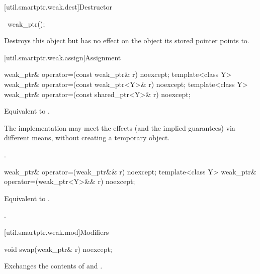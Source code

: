 [util.smartptr.weak.dest]{Destructor}

%
\begin{itemdecl}
~weak_ptr();
\end{itemdecl}

\begin{itemdescr}
\pnum\effects  Destroys this  object but has no
effect on the object its stored pointer points to.
\end{itemdescr}

[util.smartptr.weak.assign]{Assignment}

%
\begin{itemdecl}
weak_ptr& operator=(const weak_ptr& r) noexcept;
template<class Y> weak_ptr& operator=(const weak_ptr<Y>& r) noexcept;
template<class Y> weak_ptr& operator=(const shared_ptr<Y>& r) noexcept;
\end{itemdecl}

\begin{itemdescr}
\pnum\effects  Equivalent to .

\pnum\remarks  The implementation may meet the effects (and the
implied guarantees) via different means, without creating a temporary object.

\pnum\returns  {}.
\end{itemdescr}

%
\begin{itemdecl}
weak_ptr& operator=(weak_ptr&& r) noexcept;
template<class Y> weak_ptr& operator=(weak_ptr<Y>&& r) noexcept;
\end{itemdecl}

\begin{itemdescr}
\pnum\effects  Equivalent to .

\pnum\returns  {}.
\end{itemdescr}

[util.smartptr.weak.mod]{Modifiers}
%
\begin{itemdecl}
void swap(weak_ptr& r) noexcept;
\end{itemdecl}

\begin{itemdescr}
\pnum\effects  Exchanges the contents of  and .
\end{itemdescr}


